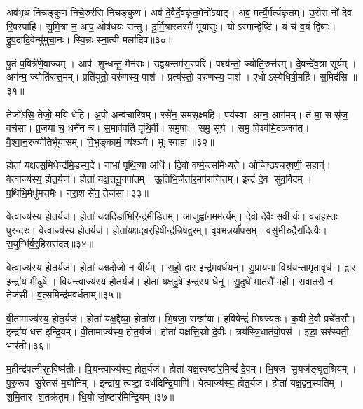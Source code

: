 अव॑भृथ निचङ्कुण निचे॒रुर॑सि निचङ्कुण।
अव॑ दे॒वैर्दे॒वकृ॑त॒मेनो॑ऽयाट्।
अव॒ मर्त्यै॒र्मर्त्य॑कृतम्।
उ॒रोरा नो॑ देव रि॒षस्पा॑हि।
सु॒मि॒त्रा न॒ आप॒ ओष॑धयः सन्तु।
दु॒र्मि॒त्रास्तस्मै॑ भूयासुः।
योऽस्मान्द्वेष्टि॑।
यं च॑ व॒यं द्वि॒ष्मः।
द्रु॒प॒दादि॒वेन्मु॑मुचा॒नः।
स्वि॒न्नः स्ना॒त्वी मला॑दिव॥३०॥

पू॒तं प॒वित्रे॑णे॒वाज्यम्।
आप॑ शुन्धन्तु॒ मैन॑सः।
उद्व॒यन्तम॑स॒स्परि॑।
पश्य॑न्तो॒ ज्योति॒रुत्त॑रम्।
दे॒वन्दे॑व॒त्रा सूर्यम्।
अग॑न्म॒ ज्योति॑रुत्त॒मम्।
प्रति॑युतो॒ वरु॑णस्य॒ पाश॑।
प्रत्य॑स्तो॒ वरु॑णस्य॒ पाश॑।
एधोऽस्येधिषी॒महि॑।
स॒मिद॑सि ॥३१॥

तेजो॑ऽसि॒ तेजो॒ मयि॑ धेहि।
अ॒पो अन्व॑चारिषम्।
रसे॑न॒ सम॑सृक्ष्महि।
पय॑स्वा अग्न॒ आग॑मम्।
तं मा॒ ससृ॑ज॒ वर्च॑सा।
प्र॒जया॑ च॒ धने॑न च।
स॒माव॑वर्ति पृथि॒वी।
समु॒षाः।
समु॒ सूर्य॑।
समु॒ विश्व॑मि॒दञ्जग॑त्।
वै॒श्वा॒न॒रज्यो॑तिर्भूयासम्।
वि॒भुङ्कामं॒ व्य॑श्ञवै।
भूः स्वाहा॥३२॥\anuvakamend[स्वप्न॒ एनासि चकृ॒मा व॒यं मु॑ञ्च॒ मला॑दिव स॒मिद॑सि॒ जग॒त्रीणि॑ च]

होता॑ यक्षत्स॒मिधेन्द्र॑मि॒डस्प॒दे।
नाभा॑ पृथि॒व्या अधि॑।
दि॒वो वर्ष्म॒न्त्समि॑ध्यते।
ओजि॑ष्ठश्चर्‌षणी॒ सहान्॑।
वेत्वाज्य॑स्य॒ होत॒र्यज॑।
होता॑ यक्ष॒त्तनू॒नपा॑तम्।
ऊ॒तिभि॒र्जेता॑र॒मप॑राजितम्।
इन्द्रं॑ दे॒व सु॑व॒र्विदम्।
प॒थिभि॒र्मधु॑मत्तमैः।
नरा॒शसे॑न॒ तेज॑सा॥३३॥

वेत्वाज्य॑स्य॒ होत॒र्यज॑।
होता॑ यक्ष॒दिडा॑भि॒रिन्द्र॑मीडि॒तम्।
आ॒जुह्वा॑न॒मम॑र्त्यम्।
दे॒वो दे॒वैः सवीर्यः।
वज्र॑हस्तः पुरन्द॒रः।
वेत्वाज्य॑स्य॒ होत॒र्यज॑।
होता॑यक्षद्ब॒र्॒हिषीन्द्र॑न्निषद्व॒रम्।
वृ॒ष॒भन्नर्या॑पसम्।
वसु॑भीरु॒द्रैरा॑दि॒त्यैः।
स॒युग्भि॑र्ब॒र्॒हिरास॑दत्॥३४॥

वेत्वाज्य॑स्य॒ होत॒र्यज॑।
होता॑ यक्ष॒दोजो॒ न वी॒र्यम्।
सहो॒ द्वार॒ इन्द्र॑मवर्धयन्।
सु॒प्रा॒य॒णा विश्र॑यन्तामृता॒वृध॑।
द्वार॒ इन्द्रा॑य मी॒ढुषे।
वि॒यन्त्वाज्य॑स्य॒ होत॒र्यज॑।
होता॑ यक्षदु॒षे इन्द्र॑स्य धे॒नू।
सु॒दुघे॑ मा॒तरौ॑ म॒ही।
सवा॒तरौ॒ न तेज॑सी।
व॒त्समिन्द्र॑मवर्धताम्॥३५॥

वी॒तामाज्य॑स्य॒ होत॒र्यज॑।
होता॑ यक्ष॒द्दैव्या॒ होता॑रा।
भि॒षजा॒ सखा॑या।
ह॒विषेन्द्रं॑ भिषज्यतः।
क॒वी दे॒वौ प्रचे॑तसौ।
इन्द्रा॑य धत्त इन्द्रि॒यम्।
वी॒तामाज्य॑स्य॒ होत॒र्यज॑।
होता॑ यक्षत्ति॒स्रो दे॒वीः।
त्रय॑स्त्रि॒धात॑वो॒पस॑।
इडा॒ सर॑स्वती॒ भार॑ती॥३६॥

म॒हीन्द्र॑पत्नीर्‌ह॒विष्म॑तीः।
वि॒यन्त्वाज्य॑स्य॒ होत॒र्यज॑।
होता॑ यक्ष॒त्त्वष्टा॑र॒मिन्द्रं॑ दे॒वम्।
भि॒षज सु॒यज॑ङ्घृत॒श्रियम्।
पु॒रु॒रूप सु॒रेत॑सं म॒घोनिम्।
इन्द्रा॑य॒ त्वष्टा॒ दध॑दिन्द्रि॒याणि॑।
वेत्वाज्य॑स्य॒ होत॒र्यज॑।
होता॑ यक्ष॒द्वन॒स्पतिम्।
श॒मि॒तार श॒तक्र॑तुम्।
धि॒यो जो॒ष्टार॑मिन्द्रि॒यम्॥३७॥

